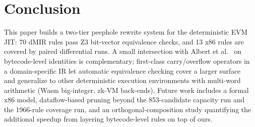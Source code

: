 \section{Conclusion}

This paper builds a two-tier peephole rewrite system for the
deterministic EVM JIT: 70 dMIR rules pass Z3 bit-vector equivalence
checks, and 13 x86 rules are covered by paired differential runs. A
small intersection with Albert et al.~\cite{verified_evm_cav23} on
bytecode-level identities is complementary; first-class carry/overflow
operators in a domain-specific IR let automatic equivalence checking
cover a larger surface and generalize to other deterministic execution
environments with multi-word arithmetic (Wasm big-integer, zk-VM
back-ends). Future work includes a formal x86 model, dataflow-based
pruning beyond the 853-candidate capacity run and the 1966-rule coverage
run, and an orthogonal-composition study quantifying the additional
speedup from layering bytecode-level rules on top of ours.
